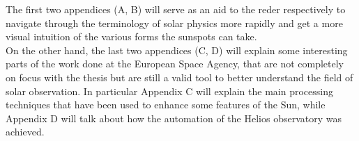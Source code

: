 The first two appendices (A, B) will serve as an aid to the reder respectively to navigate through the terminology of solar physics more rapidly and get a more visual intuition of the various forms the sunspots can take.\\
On the other hand, the last two appendices (C, D) will explain some interesting parts of the work done at the European Space Agency, that are not completely on focus with the thesis but are still a valid tool to better understand the field of solar observation. In particular Appendix C will explain the main processing techniques that have been used to enhance some features of the Sun, while Appendix D will talk about how the automation of the Helios observatory was achieved.
